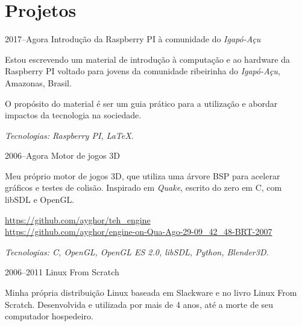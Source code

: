 \documentclass[a4paper]{simplecv}
\begin{document}
\section{Projetos}

\begin{topic}
%
%
%

\item[2017--Agora] Introdução da Raspberry PI à comunidade do \emph{Igapó-Açu}

	Estou escrevendo um material de introdução à computação e ao hardware
	da Raspberry PI voltado para jovens da comunidade ribeirinha do
	\emph{Igapó-Açu}, Amazonas, Brasil.

	O propósito do material é ser um guia prático para a utilização e
	abordar impactos da tecnologia na sociedade.

	{\em\scriptsize Tecnologias: Raspberry PI, \LaTeX{}.}

\item[2006--Agora] Motor de jogos 3D

	Meu próprio motor de jogos 3D, que utiliza uma árvore BSP para acelerar
	gráficos e testes de colisão. Inspirado em \emph{Quake}, escrito do
	zero em C, com libSDL e OpenGL.

	{\scriptsize\url{https://github.com/ayghor/teh_engine}}\\
	{\scriptsize\url{https://github.com/ayghor/engine-on-Qua-Ago-29-09\_42\_48-BRT-2007}}

	{\em\scriptsize Tecnologias: C, OpenGL, OpenGL ES 2.0, libSDL, Python,
	Blender3D.}

%
%

\item[2006--2011] Linux From Scratch

	Minha própria distribuição Linux baseada em Slackware e no livro Linux
	From Scratch. Desenvolvida e utilizada por mais de 4 anos, até a morte
	de seu computador hospedeiro.


\end{topic}
\end{document}

